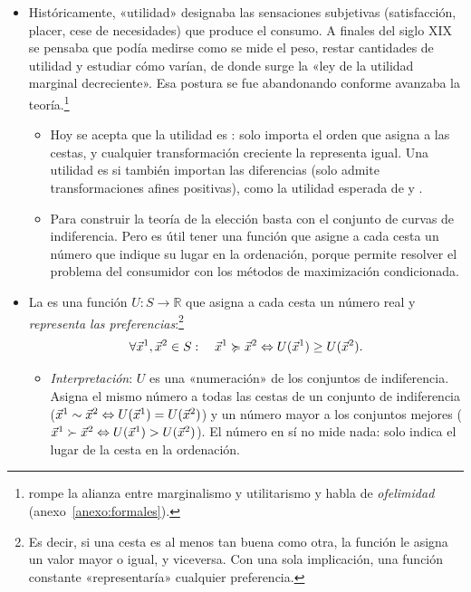 \documentclass[11pt]{article}
\begin{document}
\begin{itemize}
\item Históricamente, «utilidad» designaba las sensaciones subjetivas (satisfacción, placer, cese de necesidades) que produce el consumo. A finales del siglo XIX se pensaba que podía medirse como se mide el peso, restar cantidades de utilidad y estudiar cómo varían, de donde surge la «ley de la utilidad marginal decreciente». Esa postura se fue abandonando conforme avanzaba la teoría.\footnote{ rompe la alianza entre marginalismo y utilitarismo y habla de \emph{ofelimidad} (anexo~\ref{anexo:formales}).}
  \begin{itemize}
  \item Hoy se acepta que la utilidad es : solo importa el orden que asigna a las cestas, y cualquier transformación creciente la representa igual. Una utilidad es  si también importan las diferencias (solo admite transformaciones afines positivas), como la utilidad esperada de  y  .
  \item Para construir la teoría de la elección basta con el conjunto de curvas de indiferencia. Pero es útil tener una función que asigne a cada cesta un número que indique su lugar en la ordenación, porque permite resolver el problema del consumidor con los métodos de maximización condicionada.
  \end{itemize}
\item La  es una función $U: S\rightarrow\mathbb{R}$ que asigna a cada cesta un número real y \emph{representa las preferencias}:\footnote{Es decir, si una cesta es al menos tan buena como otra, la función le asigna un valor mayor o igual, y viceversa. Con una sola implicación, una función constante «representaría» cualquier preferencia.}
  \begin{equation}
  \forall \vec{x}^1,\vec{x}^2\in S:\quad \vec{x}^1\succcurlyeq \vec{x}^2 \Leftrightarrow U(\vec{x}^1)\geq U(\vec{x}^2). \label{eq:representacion}
  \end{equation}
  \begin{itemize}
  \item \emph{Interpretación}: $U$ es una «numeración» de los conjuntos de indiferencia. Asigna el mismo número a todas las cestas de un conjunto de indiferencia ($\vec{x}^1\sim \vec{x}^2\Leftrightarrow U(\vec{x}^1)=U(\vec{x}^2)$) y un número mayor a los conjuntos mejores ($\vec{x}^1\succ \vec{x}^2\Leftrightarrow U(\vec{x}^1)>U(\vec{x}^2)$). El número en sí no mide nada: solo indica el lugar de la cesta en la ordenación.

\end{itemize}
\end{itemize}
\end{document}
